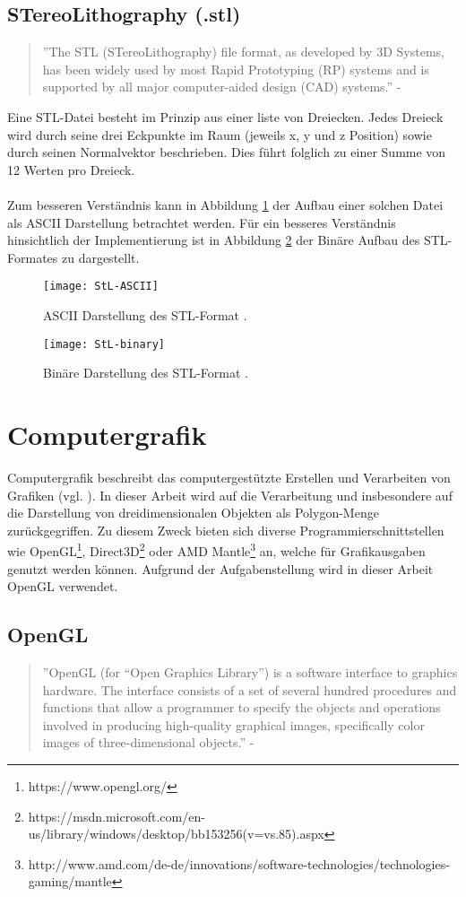 \subsection{STereoLithography (.stl)}
\begin{quote}
	''The STL (STereoLithography) file format, as developed by 3D Systems, has been widely used by most Rapid Prototyping (RP) systems and is supported by all major computer-aided design (CAD) systems.'' - \citep{STereoLithography}
\end{quote}
Eine STL-Datei besteht im Prinzip aus einer liste von Dreiecken. Jedes Dreieck wird durch seine drei Eckpunkte im Raum (jeweils x, y und z Position) sowie durch seinen Normalvektor beschrieben. Dies führt folglich zu einer Summe von 12 Werten pro Dreieck.\\
\\
Zum besseren Verständnis kann in Abbildung \ref{fig:ASCIISTL} der Aufbau einer solchen Datei als ASCII Darstellung betrachtet werden. Für ein besseres Verständnis hinsichtlich der Implementierung ist in Abbildung \ref{fig:BINARYSTL} der Binäre Aufbau des STL-Formates zu dargestellt. 

\begin{figure}
	\centering
	\texttt{[image: StL-ASCII]}
	\caption{ASCII Darstellung des STL-Format \citep{STLFormat}.}
	\label{fig:ASCIISTL}
\end{figure}

\begin{figure}
	\centering
	\texttt{[image: StL-binary]}
	\caption{Binäre Darstellung des STL-Format \citep{STLFormat}.}
	\label{fig:BINARYSTL}
\end{figure}

\section{Computergrafik}
Computergrafik beschreibt das computergestützte Erstellen und Verarbeiten von Grafiken (vgl. \citep{ComputerGraphics}). In dieser Arbeit wird auf die Verarbeitung und insbesondere auf die Darstellung von dreidimensionalen Objekten als Polygon-Menge zurückgegriffen. Zu diesem Zweck bieten sich diverse Programmierschnittstellen wie OpenGL\footnote{https://www.opengl.org/}, Direct3D\footnote{https://msdn.microsoft.com/en-us/library/windows/desktop/bb153256(v=vs.85).aspx} oder AMD Mantle\footnote{http://www.amd.com/de-de/innovations/software-technologies/technologies-gaming/mantle} an, welche für Grafikausgaben genutzt werden können. Aufgrund der Aufgabenstellung wird in dieser Arbeit OpenGL verwendet.
\subsection{OpenGL}
\begin{quote}
	''OpenGL (for “Open Graphics Library”) is a software interface to graphics hardware.
	The interface consists of a set of several hundred procedures and functions
	that allow a programmer to specify the objects and operations involved in producing
	high-quality graphical images, specifically color images of three-dimensional
	objects.'' - \citep{OpenGLDoku}
\end{quote}
